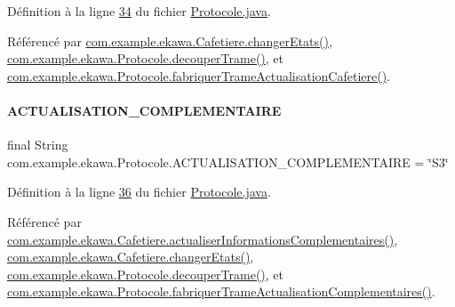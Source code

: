 Définition à la ligne \hyperlink{_protocole_8java_source_l00034}{34} du fichier \hyperlink{_protocole_8java_source}{Protocole.\+java}.



Référencé par \hyperlink{_cafetiere_8java_source_l00463}{com.\+example.\+ekawa.\+Cafetiere.\+changer\+Etats()}, \hyperlink{_protocole_8java_source_l00208}{com.\+example.\+ekawa.\+Protocole.\+decouper\+Trame()}, et \hyperlink{_protocole_8java_source_l00145}{com.\+example.\+ekawa.\+Protocole.\+fabriquer\+Trame\+Actualisation\+Cafetiere()}.

\mbox{\label{classcom_1_1example_1_1ekawa_1_1_protocole_a7751357fc287fe44de89ebd3fc9cee9b}} 
\paragraph{\texorpdfstring{A\+C\+T\+U\+A\+L\+I\+S\+A\+T\+I\+O\+N\+\_\+\+C\+O\+M\+P\+L\+E\+M\+E\+N\+T\+A\+I\+RE}{ACTUALISATION\_COMPLEMENTAIRE}}
{\footnotesize\ttfamily final String com.\+example.\+ekawa.\+Protocole.\+A\+C\+T\+U\+A\+L\+I\+S\+A\+T\+I\+O\+N\+\_\+\+C\+O\+M\+P\+L\+E\+M\+E\+N\+T\+A\+I\+RE = \char`\"{}S3\char`\"{}\hspace{0.3cm}{\ttfamily [static]}}



Définition à la ligne \hyperlink{_protocole_8java_source_l00036}{36} du fichier \hyperlink{_protocole_8java_source}{Protocole.\+java}.



Référencé par \hyperlink{_cafetiere_8java_source_l00574}{com.\+example.\+ekawa.\+Cafetiere.\+actualiser\+Informations\+Complementaires()}, \hyperlink{_cafetiere_8java_source_l00463}{com.\+example.\+ekawa.\+Cafetiere.\+changer\+Etats()}, \hyperlink{_protocole_8java_source_l00208}{com.\+example.\+ekawa.\+Protocole.\+decouper\+Trame()}, et \hyperlink{_protocole_8java_source_l00165}{com.\+example.\+ekawa.\+Protocole.\+fabriquer\+Trame\+Actualisation\+Complementaires()}.

